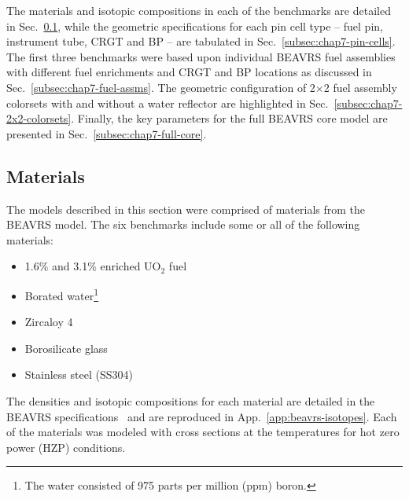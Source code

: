 
The materials and isotopic compositions in each of the benchmarks are detailed in Sec.~\ref{subsec:chap7-materials}, while the geometric specifications for each pin cell type -- fuel pin, instrument tube, \ac{CRGT} and \ac{BP} -- are tabulated in Sec.~\ref{subsec:chap7-pin-cells}. The first three benchmarks were based upon individual \ac{BEAVRS} fuel assemblies with different fuel enrichments and \ac{CRGT} and \ac{BP} locations as discussed in Sec.~\ref{subsec:chap7-fuel-assms}. The geometric configuration of 2$\times$2 fuel assembly colorsets with and without a water reflector are highlighted in Sec.~\ref{subsec:chap7-2x2-colorsets}. Finally, the key parameters for the full \ac{BEAVRS} core model are presented in Sec.~\ref{subsec:chap7-full-core}.


\subsection{Materials}
\label{subsec:chap7-materials}

The models described in this section were comprised of materials from the \ac{BEAVRS} model. The six benchmarks include some or all of the following materials:

\begin{itemize}[noitemsep,topsep=0pt]
  \item 1.6\% and 3.1\% enriched UO$_2$ fuel
  \item Borated water\footnote{The water consisted of 975 parts per million (ppm) boron.}
  \item Zircaloy 4
  \item Borosilicate glass
  \item Stainless steel (SS304)
\end{itemize}

\noindent The densities and isotopic compositions for each material are detailed in the \ac{BEAVRS} specifications~\cite{horelik2013beavrs} and are reproduced in App.~\ref{app:beavrs-isotopes}. Each of the materials was modeled with cross sections at the temperatures for hot zero power (HZP) conditions.

